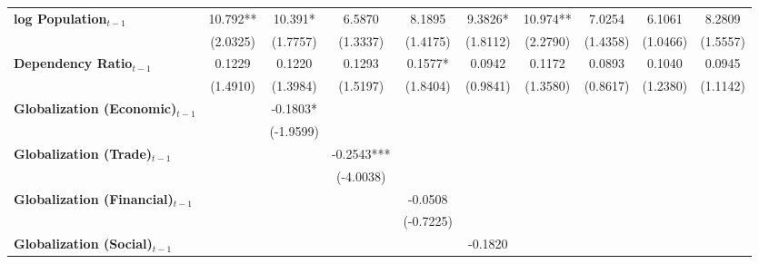 \begin{center}
\begin{tabular}{lccccccccc}
\textbf{log Population$_{t-1}$}      &    10.792**    &     10.391*      &      6.5870      &      8.1895      &     9.3826*      &     10.974**     &      7.0254      &      6.1061      &      8.2809       \\
\textbf{ }                         &    (2.0325)    &     (1.7757)     &     (1.3337)     &     (1.4175)     &     (1.8112)     &     (2.2790)     &     (1.4358)     &     (1.0466)     &     (1.5557)      \\
\textbf{Dependency Ratio$_{t-1}$}   &     0.1229     &      0.1220      &      0.1293      &     0.1577*      &      0.0942      &      0.1172      &      0.0893      &      0.1040      &      0.0945       \\
\textbf{ }                         &    (1.4910)    &     (1.3984)     &     (1.5197)     &     (1.8404)     &     (0.9841)     &     (1.3580)     &     (0.8617)     &     (1.2380)     &     (1.1142)      \\
\textbf{Globalization (Economic)$_{t-1}$}             &                &     -0.1803*     &                  &                  &                  &                  &                  &                  &                   \\
\textbf{ }                         &                &    (-1.9599)     &                  &                  &                  &                  &                  &                  &                   \\
\textbf{Globalization (Trade)$_{t-1}$}             &                &                  &    -0.2543***    &                  &                  &                  &                  &                  &                   \\
\textbf{ }                         &                &                  &    (-4.0038)     &                  &                  &                  &                  &                  &                   \\
\textbf{Globalization (Financial)$_{t-1}$}             &                &                  &                  &     -0.0508      &                  &                  &                  &                  &                   \\
\textbf{ }                         &                &                  &                  &    (-0.7225)     &                  &                  &                  &                  &                   \\
\textbf{Globalization (Social)$_{t-1}$}             &                &                  &                  &                  &     -0.1820      &                  &                  &                  &                   \\

\end{tabular}
\end{center}
